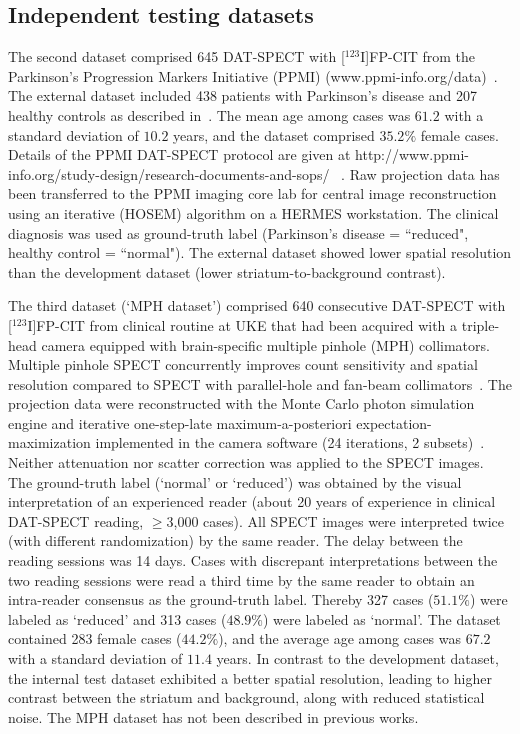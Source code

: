 \subsection{Independent testing datasets}
\label{subsec:external_dataset}

The second dataset comprised 645 DAT-SPECT with [$^{123}$I]FP-CIT from the Parkinson's Progression Markers Initiative (PPMI) 
(www.ppmi-info.org/data)~\citep{Parkinson_Progression_Marker_Initiative2011-px}.
The external dataset included 438 patients with Parkinson's disease and 207 healthy controls as described in~\cite{Wenzel2019}.
The mean age among cases was $61.2$ with a standard deviation of $10.2$ years, 
and the dataset comprised $35.2\%$ female cases.
Details of the PPMI DAT-SPECT protocol are given at http://www.ppmi-info.org/study-design/research-documents-and-sops/ ~\citep{Parkinson_Progression_Marker_Initiative2011-px}. 
Raw projection data has been transferred to the PPMI imaging core lab for central image reconstruction using an iterative (HOSEM) algorithm on a HERMES workstation. 
The clinical diagnosis was used as ground-truth label (Parkinson's disease = ``reduced", healthy control = ``normal"). 
The external dataset showed lower spatial resolution than the development dataset (lower striatum-to-background contrast).

The third dataset (`MPH dataset') comprised 640 consecutive DAT-SPECT with [$^{123}$I]FP-CIT from clinical routine at UKE 
that had been acquired with a triple-head camera equipped with brain-specific multiple pinhole (MPH) collimators. 
Multiple pinhole SPECT concurrently improves count sensitivity and spatial resolution compared to SPECT with parallel-hole 
and fan-beam collimators~\citep{Mathies2022-yi, Tecklenburg2020-xr}.
The projection data were reconstructed with the Monte Carlo photon simulation engine 
and iterative one-step-late maximum-a-posteriori expectation-maximization implemented 
in the camera software (24 iterations, 2 subsets)~\citep{Tecklenburg2020-xr, Magdics2010}.
Neither attenuation nor scatter correction was applied to the SPECT images.
The ground-truth label (`normal' or `reduced') was obtained by the visual interpretation of an experienced reader 
(about 20 years of experience in clinical DAT-SPECT reading, $\geq$3,000 cases).
All SPECT images were interpreted twice (with different randomization) by the same reader. 
The delay between the reading sessions was 14 days. 
Cases with discrepant interpretations between the two reading sessions were read a third time by the same reader 
to obtain an intra-reader consensus as the ground-truth label. 
Thereby 327 cases ($51.1\%$) were labeled as `reduced'  and 313 cases ($48.9\%$) were labeled as `normal'.
The dataset contained 283 female cases ($44.2\%$),
and the average age among cases was $67.2$ with a standard deviation of $11.4$ years.
In contrast to the development dataset, the internal test dataset exhibited a better spatial resolution, 
leading to higher contrast between the striatum and background, along with reduced statistical noise.
The MPH dataset has not been described in previous works.

